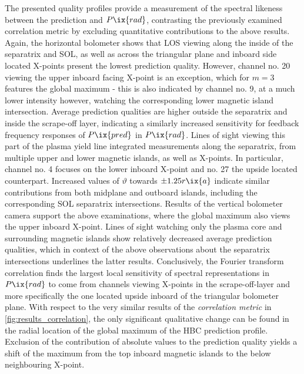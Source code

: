             The presented quality profiles provide a measurement of the spectral likeness between the prediction and $P\ix{rad}$, contrasting the previously examined correlation metric by excluding quantitative contributions to the above results. Again, the horizontal bolometer shows that LOS viewing along the inside of the separatrix and SOL, as well as across the triangular plane and inboard side located X-points present the lowest prediction quality. However, channel no. 20 viewing the upper inboard facing X-point is an exception, which for $m=3$ features the global maximum - this is also indicated by channel no. 9, at a much lower intensity however, watching the corresponding lower magnetic island intersection. Average prediction qualities are higher outside the separatrix and inside the scrape-off layer, indicating a similarly increased sensitivity for feedback frequency responses of $P\ix{pred}$ in $P\ix{rad}$. Lines of sight viewing this part of the plasma yield line integrated measurements along the separatrix, from multiple upper and lower magnetic islands, as well as X-points. In particular, channel no. 4 focuses on the lower inboard X-point and no. 27 the upside located counterpart. Increased values of $\vartheta$ towards $\pm1.25r\ix{a}$ indicate similar contributions from both midplane and outboard islands, including the corresponding SOL separatrix intersections. Results of the vertical bolometer camera support the above examinations, where the global maximum also views the upper inboard X-point. Lines of sight watching only the plasma core and surrounding magnetic islands show relatively decreased average prediction qualities, which in context of the above observations about the separatrix intersections underlines the latter results. Conclusively, the Fourier transform correlation finds the largest local sensitivity of spectral representations in $P\ix{rad}$ to come from channels viewing X-points in the scrape-off-layer and more specifically the one located upside inboard of the triangular bolometer plane. With respect to the very similar results of the \textit{correlation metric} in \cref{fig:results_correlation}, the only significant qualitative change can be found in the radial location of the global maximum of the HBC prediction profile. Exclusion of the contribution of absolute values to the prediction quality yields a shift of the maximum from the top inboard magnetic islands to the below neighbouring X-point.%
%
